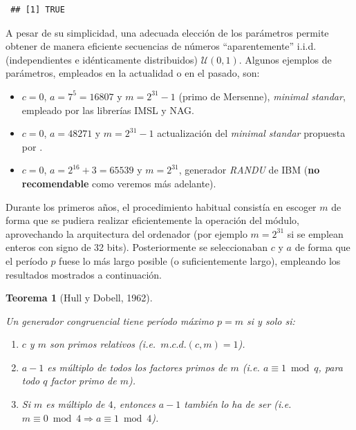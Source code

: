 \documentclass[
  spanish,
  10pt,
]{book}
\theoremstyle{break}
\newtheorem{theorem}{Teorema}[chapter]
\theoremstyle{nonumberplain}
\begin{document}
\begin{verbatim}
 ## [1] TRUE
\end{verbatim}

A pesar de su simplicidad, una adecuada elección de los parámetros permite obtener de manera eficiente secuencias de números ``aparentemente'' i.i.d. (independientes e idénticamente distribuidos) \(\mathcal{U}(0,1)\).
Algunos ejemplos de parámetros, empleados en la actualidad o en el pasado, son:

\begin{itemize}
\item
  \(c=0\), \(a=7^{5}=16807\) y \(m=2^{31}-1\) (primo de Mersenne), \citet{park1988}
  \emph{minimal standar}, empleado por las librerías IMSL y NAG.
\item
  \(c=0\), \(a=48271\) y \(m=2^{31}-1\) actualización del \emph{minimal standar}
  propuesta por \citet{park1993}.
\item
  \(c=0\), \(a=2^{16}+3=65539\) y \(m=2^{31}\), generador \emph{RANDU} de IBM
  (\textbf{no recomendable} como veremos más adelante).
\end{itemize}

Durante los primeros años, el procedimiento habitual consistía en escoger \(m\) de forma que se pudiera realizar eficientemente la operación del módulo, aprovechando la arquitectura del ordenador (por ejemplo \(m = 2^{31}\) si se emplean enteros con signo de 32 bits).
Posteriormente se seleccionaban \(c\) y \(a\) de forma que el período \(p\) fuese lo más largo posible (o suficientemente largo), empleando los resultados mostrados a continuación.

\begin{theorem}[Hull y Dobell, 1962]
\protect\hypertarget{thm:hull-dobell}{}\label{thm:hull-dobell}

Un generador congruencial tiene período máximo \(p = m\) si y solo si:

\begin{enumerate}
\def\labelenumi{\arabic{enumi}.}
\item
  \(c\) y \(m\) son primos relativos (i.e.~\(m.c.d.(c, m) = 1\)).
\item
  \(a-1\) es múltiplo de todos los factores primos de \(m\) (i.e.
  \(a \equiv 1 \bmod q\), para todo \(q\) factor primo de \(m\)).
\item
  Si \(m\) es múltiplo de \(4\), entonces \(a-1\) también lo ha de
  ser (i.e.~\(m \equiv 0 \bmod 4\Rightarrow a \equiv
  1 \bmod 4\)).
\end{enumerate}

\end{theorem}
\end{document}
